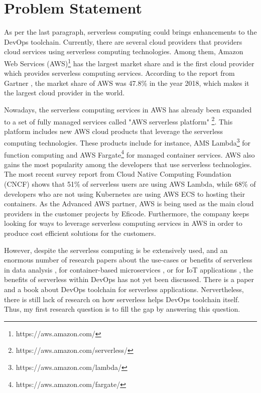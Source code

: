 \section{Problem Statement}
As per the last paragraph, serverless computing could brings enhancements to the DevOps toolchain. Currently, there are several cloud providers that providers cloud services using serverless computing technologies. 
Among them, Amazon Web Services (AWS)\footnote{https://aws.amazon.com/} has the largest market share and is the first cloud provider which provides serverless computing services. According to the report from Gartner \cite{GartnerS47:online}, the market share of AWS was 47.8\% in the year 2018, which makes it the largest cloud provider in the world.
\par
Nowadays, the serverless computing services in AWS has already been expanded to a set of fully managed services called "AWS serverless platform" \footnote{https://aws.amazon.com/serverless/}. This platform includes new AWS cloud products that leverage the serverless computing technologies. These products include for instance, AMS Lambda\footnote{https://aws.amazon.com/lambda/} for function computing and AWS Fargate\footnote{https://aws.amazon.com/fargate/} for managed container services.
AWS also gains the most popularity among the developers that use serverless technologies. The most recent survey report \cite{cncf2020} from Cloud Native Computing Foundation (CNCF) shows that 51\% of serverless users are using AWS Lambda, while 68\% of developers who are not using Kubernetes are using AWS ECS to hosting their containers.
As the Advanced AWS partner, AWS is being used as the main cloud providers in the customer projects by Eficode. Furthermore, the company keeps looking for ways to leverage serverless computing services in AWS in order to produce cost efficient solutions for the customers.
\par
However, despite the serverless computing is be extensively used, and an enormous number of research papers about the use-cases or benefits of serverless in data analysis \cite{8457831}, for container-based microservices \cite{perez2018serverless}, or for IoT applications \cite{nastic2017serverless} \cite{glikson2017deviceless}, the benefits of serverless within DevOps has not yet been discussed. There is a paper \cite{ivanov2018implementation} and a book \cite{bangera2018devops} about DevOps toolchain for serverless applications. Nervertheless, there is still lack of research on how serverless helps DevOps toolchain itself. Thus, my first research question is to fill the gap by answering this question. 
